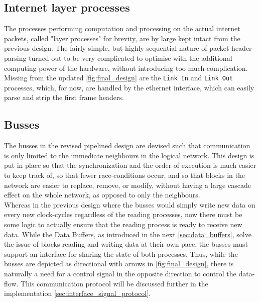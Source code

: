 \subsection{Internet layer processes} \label{sec:layer_processes}
The processes performing computation and processing on the actual internet
packets, called "layer processes" for brevity, are by large kept intact from the
previous design. The fairly simple, but highly sequential nature of packet
header parsing turned out to be very complicated to optimise with the additional
computing power of the hardware, without introducing too much complication.\\
Missing from the updated \autoref{fig:final_design} are the \texttt{Link In}
and \texttt{Link Out} processes, which, for now, are handled by the ethernet
interface, which can easily parse and strip the first frame headers.


\subsection{Busses}
The busses in the revised pipelined design are devised such that communication
is only limited to the immediate neighbours in the logical network. This design
is put in place so that the synchronization and the order of execution is much
easier to keep track of, so that fewer race-conditions occur, and so that blocks
in the network are easier to replace, remove, or modify, without having a large
cascade effect on the whole network, as opposed to only the neighbours.\\
Whereas in the previous design where the busses would simply write new data on
every new clock-cycles regardless of the reading processes, now there must be
some logic to actually ensure that the reading process is ready to receive new
data. While the Data Buffers, as introduced in the next \autoref{sec:data_buffers},
solve the issue of blocks reading and writing data at their own pace, the busses
must support an interface for sharing the state of both processes. Thus, while
the busses are depicted as directional with arrows in \autoref{fig:final_design},
there is naturally a need for a control signal in the opposite direction to
control the data-flow. This communication protocol will be discussed further in
the implementation \autoref{sec:interface_signal_protocol}.


